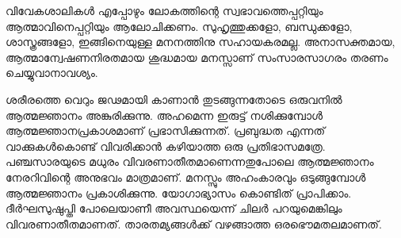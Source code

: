 വിവേകശാലികള്‍ എപ്പോഴും ലോകത്തിന്റെ സ്വഭാവത്തെപ്പറ്റിയും ആത്മാവിനെപ്പറ്റിയും ആലോചിക്കണം. സുഹൃത്തുക്കളോ, ബന്ധുക്കളോ, ശാസ്ത്രങ്ങളോ, ഇങ്ങിനെയുള്ള മനനത്തിനു സഹായകരമല്ല. അനാസക്തമായ, ആത്മാന്വേഷണനിരതമായ ശുദ്ധമായ മനസ്സാണ് സംസാരസാഗരം തരണം ചെയ്യുവാനാവശ്യം.

ശരീരത്തെ വെറും ജഢമായി കാണാന്‍ തുടങ്ങുന്നതോടെ ഒരുവനില്‍ ആത്മജ്ഞാനം അങ്കുരിക്കുന്നു. അഹമെന്ന ഇരുട്ട് നശിക്കുമ്പോള്‍ ആത്മജ്ഞാനപ്രകാശമാണ് പ്രഭാസിക്കുന്നത്. പ്രബുദ്ധത എന്നത്  വാക്കുകള്‍കൊണ്ട് വിവരിക്കാന്‍ കഴിയാത്ത ഒരു പ്രതിഭാസമത്രേ. പഞ്ചസാരയുടെ മധുരം വിവരണാതീതമാണെന്നതുപോലെ ആത്മജ്ഞാനം നേരറിവിന്റെ അനുഭവം മാത്രമാണ്. മനസ്സും അഹംകാരവും ഒടുങ്ങുമ്പോള്‍ ആത്മജ്ഞാനം പ്രകാശിക്കുന്നു. യോഗാഭ്യാസം കൊണ്ടിത് പ്രാപിക്കാം. ദീര്‍ഘസുഷുപ്തി പോലെയാണീ അവസ്ഥയെന്ന് ചിലര്‍ പറയുമെങ്കിലും വിവരണാതീതമാണത്. താരതമ്യങ്ങള്‍ക്ക് വഴങ്ങാത്ത ഒരഭൌമതലമാണത്.

